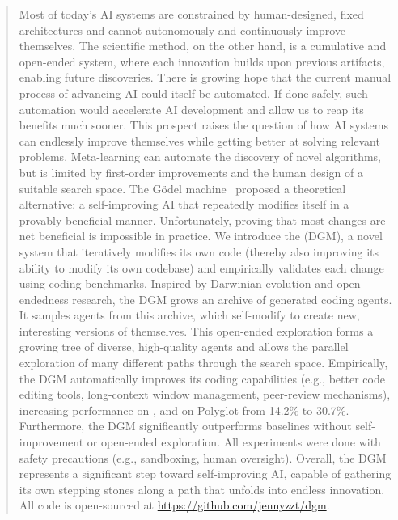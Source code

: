 \begin{abstract}
Most of today's AI systems are constrained by human-designed, fixed architectures and cannot autonomously and continuously improve themselves. The scientific method, on the other hand, is a cumulative and open-ended system, where each innovation builds upon previous artifacts, enabling future discoveries. There is growing hope that the current manual process of advancing AI could itself be automated. If done safely, such automation would accelerate AI development and allow us to reap its benefits much sooner. This prospect raises the question of how AI systems can endlessly improve themselves while getting better at solving relevant problems. Meta-learning can automate the discovery of novel algorithms, but is limited by first-order improvements and the human design of a suitable search space. The G\"odel machine~\citep{schmidhuber2007godel} proposed a theoretical alternative: a self-improving AI that repeatedly modifies itself in a provably beneficial manner. Unfortunately, proving that most changes are net beneficial is impossible in practice. We introduce the \MethodName{} (DGM), a novel \CoreTerm{} system that iteratively modifies its own code (thereby also improving its ability to modify its own codebase) and empirically validates each change using coding benchmarks. Inspired by Darwinian evolution and open-endedness research, the DGM grows an archive of generated coding agents. It samples agents from this archive, which self-modify to create new, interesting versions of themselves. This open-ended exploration forms a growing tree of diverse, high-quality agents and allows the parallel exploration of many different paths through the search space. Empirically, the DGM automatically improves its coding capabilities (e.g., better code editing tools, long-context window management, peer-review mechanisms), increasing performance on \MainResult{}, and on Polyglot from 14.2\% to 30.7\%. Furthermore, the DGM significantly outperforms baselines without self-improvement or open-ended exploration. All experiments were done with safety precautions (e.g., sandboxing, human oversight). Overall, the DGM represents a significant step toward self-improving AI, capable of gathering its own stepping stones along a path that unfolds into endless innovation.
All code is open-sourced at \href{https://github.com/jennyzzt/dgm}{https://github.com/jennyzzt/dgm}.
\end{abstract}
